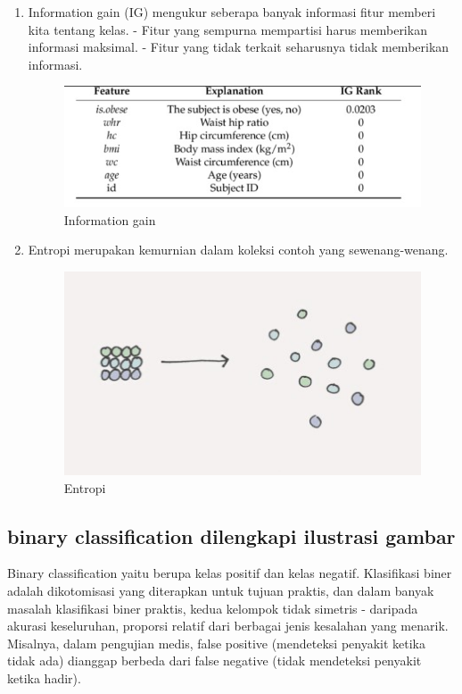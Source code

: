 \begin{enumerate}
\item Information gain (IG) mengukur seberapa banyak informasi fitur memberi kita tentang kelas. - Fitur yang sempurna mempartisi harus memberikan informasi maksimal. - Fitur yang tidak terkait seharusnya tidak memberikan informasi.

\begin{figure}[ht]
\centering
\includegraphics[scale=0.5]{figures/f7.jpg}
\caption{Information gain}
\label{contoh}
\end{figure}

\item Entropi merupakan kemurnian dalam koleksi contoh yang sewenang-wenang.

\begin{figure}[ht]
\centering
\includegraphics[scale=0.5]{figures/f8.jpg}
\caption{Entropi}
\label{contoh}
\end{figure}
\end{enumerate}

\subsection{binary classification dilengkapi ilustrasi gambar}

\par Binary classification yaitu berupa kelas positif dan kelas negatif. Klasifikasi biner adalah dikotomisasi yang diterapkan untuk tujuan praktis, dan dalam banyak masalah klasifikasi biner praktis, kedua kelompok tidak simetris - daripada akurasi keseluruhan, proporsi relatif dari berbagai jenis kesalahan yang menarik. Misalnya, dalam pengujian medis, false positive (mendeteksi penyakit ketika tidak ada) dianggap berbeda dari false negative (tidak mendeteksi penyakit ketika hadir).

